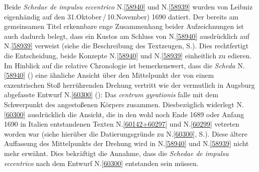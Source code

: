 \footnotesize%
\pstart%
\noindent%
Beide \textit{Schedae de impulsu eccentrico} N.\;\ref{58940} und N.\;\ref{58939} wurden von Leibniz eigenhändig auf den 31.\;Okto\-ber\,/\,10.\;November) 1690 datiert.
Der bereits am gemeinsamen Titel erkennbare enge Zusammenhang beider Aufzeichnungen ist auch dadurch belegt, dass ein Kustos am Schluss von N.\;\ref{58940} %
ausdrücklich auf N.\;\ref{58939} verweist (siehe die Beschreibung des Textzeugen, S.\;\pageref{LH_35_11_14_005-006_ueberlieferung}).
Dies rechtfertigt die Entscheidung, beide Konzepte N.\;\ref{58940} und N.\;\ref{58939} einheitlich zu edieren.
\pend%
\pstart%
Im Hinblick auf die relative Chronologie %
ist bemerkenswert, dass die \textit{Scheda} N.\;\ref{58940} () eine ähnliche Ansicht über den Mittelpunkt der von einem exzentrischen Stoß herrührenden Drehung vertritt wie der vermutlich in Augsburg abgefasste Entwurf N.\;\ref{60300} ():
Das \textit{centrum gyrationis} falle mit dem Schwerpunkt des angestoßenen Körpers zusammen.
Diesbezüglich widerlegt N.\;\ref{60300} ausdrücklich die Ansicht, die in den wohl noch Ende 1689 oder Anfang 1690 in Italien entstandenen Texten N.\;\ref{60142+60297} und N.\;\ref{60299} vetreten worden war (siehe hierüber die Datierungsgründe zu N.\;\ref{60300}, S.\;\pageref{LH_37_05_044_datierung}).
Diese ältere Auffassung des Mittelpunkts der Drehung wird in N.\;\ref{58940} und N.\;\ref{58939} nicht mehr erwähnt.
Dies bekräftigt die Annahme, dass die \textit{Schedae de impulsu eccentrico} nach dem Entwurf N.\;\ref{60300} entstanden sein müssen.
\pend
{}%
\frenchspacing%
\normalsize%
\newpage %
